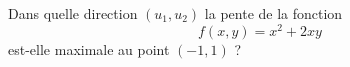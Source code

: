 
\begin{exercice}\label{exoOutilsMath-0031}

    Dans quelle direction $(u_1,u_2)$ la pente de la fonction
    \begin{equation}
        f(x,y)=x^2+2xy
    \end{equation}
    est-elle maximale au point $(-1,1)$ ?

\end{exercice}
